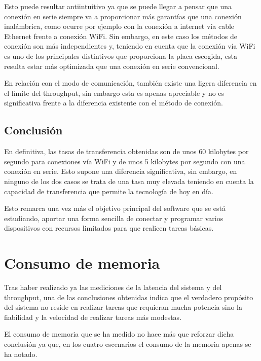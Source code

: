 \documentclass[a4paper,11pt,spanish]{sphinxmanual}
\begin{document}
\sphinxAtStartPar
Esto puede resultar anti\sphinxhyphen{}intuitivo ya que se puede llegar a pensar que una conexión
en serie siempre va a proporcionar más garantías que una conexión inalámbrica, como ocurre
por ejemplo con la conexión a internet vía cable Ethernet frente a conexión
Wi\sphinxhyphen{}Fi. Sin embargo, en este caso los métodos de conexión son más independientes y,
teniendo en cuenta que la conexión vía Wi\sphinxhyphen{}Fi es uno de los principales distintivos
que proporciona la placa escogida, esta resulta estar más optimizada que una conexión
en serie convencional.

\sphinxAtStartPar
En relación con el modo de comunicación, también existe una ligera diferencia en el límite
del throughput, sin embargo esta es apenas apreciable y no es significativa frente a la
diferencia existente con el método de conexión.


\subsection{Conclusión}
\label{\detokenize{resultados:id1}}
\sphinxAtStartPar
En definitiva, las tasas de transferencia obtenidas son de unos 60 kilobytes por segundo
para conexiones vía Wi\sphinxhyphen{}Fi y de unos 5 kilobytes por segundo con una conexión en serie.
Esto supone una diferencia significativa, sin embargo, en ninguno de los dos casos
se trata de una tasa muy elevada teniendo en cuenta la capacidad de transferencia que
permite la tecnología de hoy en día.

\sphinxAtStartPar
Esto remarca una vez más el objetivo principal del software que se está estudiando,
aportar una forma sencilla de conectar y programar varios dispositivos con recursos limitados
para que realicen tareas básicas.


\section{Consumo de memoria}
\label{\detokenize{resultados:consumo-de-memoria}}
\sphinxAtStartPar
Tras haber realizado ya las mediciones de la latencia del sistema y del throughput,
una de las conclusiones obtenidas indica que el verdadero propósito del sistema no
reside en realizar tareas que requieran mucha potencia sino la fiabilidad y la velocidad
de realizar tareas más modestas.

\sphinxAtStartPar
El consumo de memoria que se ha medido no hace más que reforzar dicha conclusión ya que,
en los cuatro escenarios el consumo de la memoria apenas se ha notado.
\end{document}
